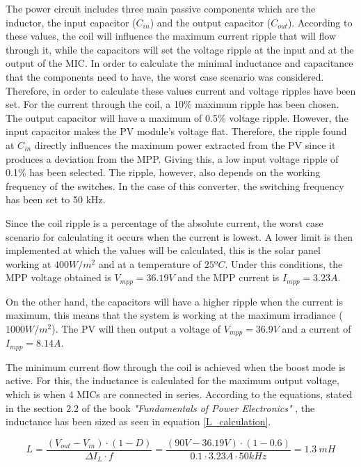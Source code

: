 The power circuit includes three main passive components which are the inductor, the input capacitor ($C_{in}$) and the output capacitor ($C_{out}$). According to these values, the coil will influence the maximum current ripple that will flow through it, while the capacitors will set the voltage ripple at the input and at the output of the MIC. In order to calculate the minimal inductance and capacitance that the components need to have, the worst case scenario was considered.
\label{sec:componentsizing}
Therefore, in order to calculate these values current and voltage ripples have been set. For the current through the coil, a 10\% maximum ripple has been chosen. The output capacitor will  have a maximum of 0.5\% voltage ripple. However, the input capacitor makes the PV module's voltage flat. Therefore, the ripple found at $C_{in}$ directly influences the maximum power extracted from the PV since it produces a deviation from the MPP. Giving this, a low input voltage ripple of 0.1\% has been selected. The ripple, however, also depends on the working frequency of the switches. In the case of this converter, the switching frequency has been set to 50 kHz. 

Since the coil ripple is a percentage of the absolute current, the worst case scenario for calculating it occurs when the current is lowest. A lower limit is then implemented at which the values will be calculated, this is the solar panel working at $400 W/m^2$ and at a temperature of $25 ºC$. Under this conditions, the MPP voltage obtained is $V_{mpp} = 36.19 V$ and the MPP current is $I_{mpp} = 3.23A$.

On the other hand, the capacitors will have a higher ripple when the current is maximum, this means that the system is working at the maximum irradiance ($1000 W/m^2$). The PV will then output a voltage of $V_{mpp} = 36.9 V$ and a current of $I_{mpp} = 8.14 A$.

The minimum current flow through the coil is achieved when the boost mode is active. For this, the inductance is calculated for the maximum output voltage, which is when 4 MICs are connected in series. According to the equations, stated in the section 2.2 of the book \textit{"Fundamentals of Power Electronics"} \cite{Erickson}, the inductance has been sized as seen in equation \ref{L_calculation}.

\begin{equation} \label{L_calculation}
L = \frac{(V_{out} - V_{in}) \cdot (1-D)}{\Delta I_{L} \cdot f} = \frac{(90 V - 36.19 V) \cdot (1-0.6)}{0.1 \cdot 3.23 A \cdot 50 kHz} = 1.3 \ mH
\end{equation}

